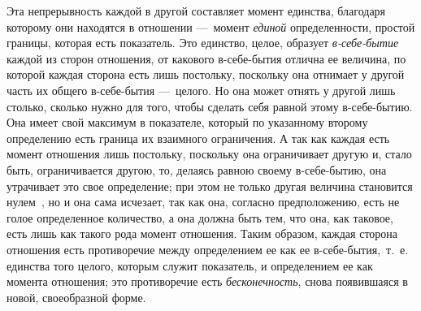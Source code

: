 Эта непрерывность каждой в другой составляет момент единства, благодаря
которому они находятся в отношении —~момент
{\em единой} определенности, простой границы, которая
есть показатель. Это единство, целое, образует
{\em в-себе-бытие} каждой из сторон отношения, от
какового в-себе-бытия отлична ее {}
величина, по которой каждая сторона есть лишь постольку, поскольку она
отнимает у другой часть их общего в-себе-бытия —~целого. Но она может
отнять у другой лишь столько, сколько нужно для того, чтобы сделать себя
равной этому в-себе-бытию. Она имеет свой максимум в показателе, который по
указанному второму определению есть граница их взаимного ограничения. А так
как каждая есть момент отношения лишь постольку, поскольку она ограничивает
другую и, стало быть, ограничивается другою, то, делаясь равною своему
в-себе-бытию, она утрачивает это свое определение; при этом не только
другая величина становится
нулем~,
но и она сама исчезает, так как она, согласно предположению, есть не голое
определенное количество, а она должна быть тем, что она, как таковое, есть
лишь как такого рода момент отношения. Таким образом, каждая сторона
отношения есть противоречие между определением ее как ее
в-себе-бытия,~т.~е. единства того целого, которым служит показатель, и
определением ее как момента отношения; это противоречие есть
{\em бесконечность}, снова появившаяся в новой,
своеобразной форме.


